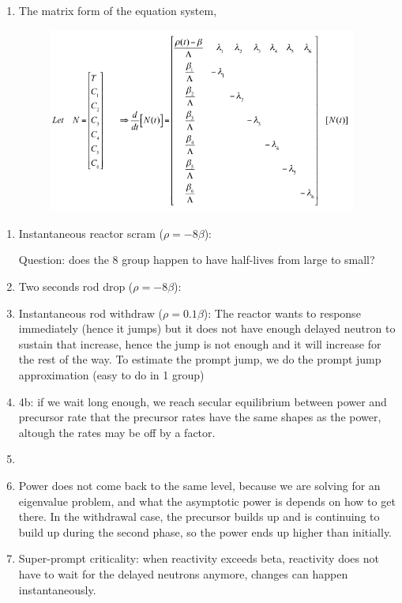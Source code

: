 \documentclass{school-22.211-notes}
\begin{document}
\begin{enumerate}
\item The matrix form of the equation system, 
\begin{figure}[ht]
  \centering
  \includegraphics[width=4in]{images/pke/matrix-form.png}
\end{figure}
\end{enumerate}

\clearpage
{}

\begin{enumerate}
\item Instantaneous reactor scram ($\rho = - 8 \beta$): 

Question: does the 8 group happen to have half-lives from large to small? 
\item Two seconds rod drop ($\rho = - 8 \beta$):

\item Instantaneous rod withdraw ($\rho = 0.1 \beta$): 
The reactor wants to response immediately (hence it jumps) but it does not have enough delayed neutron to sustain that increase, hence the jump is not enough and it will increase for the rest of the way. To estimate the prompt jump, we do the prompt jump approximation (easy to do in 1 group)

\item 4b: if we wait long enough, we reach secular equilibrium between power and precursor rate that the precursor rates have the same shapes as the power, altough the rates may be off by a factor. 

\item 

\item Power does not come back to the same level, because we are solving for an eigenvalue problem, and what the asymptotic power is depends on how to get there. In the withdrawal case, the precursor builds up and is continuing to build up during the second phase, so the power ends up higher than initially. 


\item Super-prompt criticality: when reactivity exceeds beta, reactivity does not have to wait for the delayed neutrons anymore, changes can happen instantaneously.  
\end{enumerate}
\end{document}
